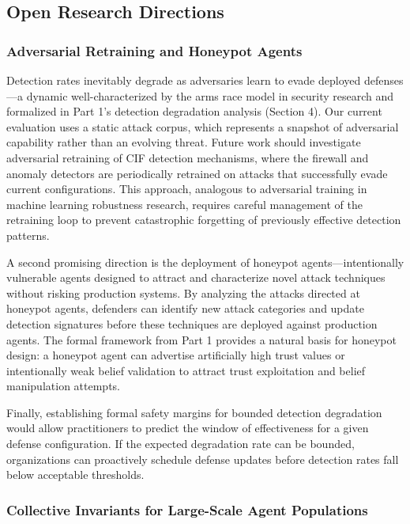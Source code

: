\documentclass[
]{article}
\begin{document}
\subsection{Open Research Directions}\label{open-research-directions}

\subsubsection{Adversarial Retraining and Honeypot
Agents}\label{adversarial-retraining-and-honeypot-agents}

Detection rates inevitably degrade as adversaries learn to evade
deployed defenses---a dynamic well-characterized by the arms race model
in security research and formalized in Part 1's detection degradation
analysis (Section 4). Our current evaluation uses a static attack
corpus, which represents a snapshot of adversarial capability rather
than an evolving threat. Future work should investigate adversarial
retraining of CIF detection mechanisms, where the firewall and anomaly
detectors are periodically retrained on attacks that successfully evade
current configurations. This approach, analogous to adversarial training
in machine learning robustness research, requires careful management of
the retraining loop to prevent catastrophic forgetting of previously
effective detection patterns.

A second promising direction is the deployment of honeypot
agents---intentionally vulnerable agents designed to attract and
characterize novel attack techniques without risking production systems.
By analyzing the attacks directed at honeypot agents, defenders can
identify new attack categories and update detection signatures before
these techniques are deployed against production agents. The formal
framework from Part 1 provides a natural basis for honeypot design: a
honeypot agent can advertise artificially high trust values or
intentionally weak belief validation to attract trust exploitation and
belief manipulation attempts.

Finally, establishing formal safety margins for bounded detection
degradation would allow practitioners to predict the window of
effectiveness for a given defense configuration. If the expected
degradation rate can be bounded, organizations can proactively schedule
defense updates before detection rates fall below acceptable thresholds.

\subsubsection{Collective Invariants for Large-Scale Agent
Populations}\label{collective-invariants-for-large-scale-agent-populations}
\end{document}
